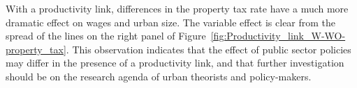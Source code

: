 
With a productivity link, differences in the property tax rate have a much more dramatic effect on wages and urban size. The variable effect is clear from the spread of the lines on the right panel of Figure~\ref{fig:Productivity_link_W-WO-property_tax}.  This observation indicates that the effect of public sector policies may differ in the presence of a productivity link, and that further investigation %
should be on the research agenda of urban theorists and policy-makers.



